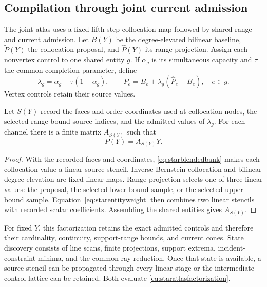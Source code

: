 \subsection{Compilation through joint current admission}
The joint atlas uses a fixed fifth-step collocation map followed by shared
range and current admission. Let $B(Y)$ be the degree-elevated bilinear
baseline, $\widetilde P(Y)$ the collocation proposal, and $\widehat P(Y)$ its
range projection. Assign each nonvertex control to one shared entity $g$.
If $\alpha_g$ is its simultaneous capacity and $\tau$ the common completion
parameter, define
\begin{equation}
 \lambda_g=\alpha_g+\tau(1-\alpha_g),\qquad
 P_e=B_e+\lambda_g(\widehat P_e-B_e),\quad e\in g.
 \label{eq:starentityweight}
\end{equation}
Vertex controls retain their source values.

\begin{theorem}
Let $S(Y)$ record the faces and order coordinates used at collocation nodes,
the selected range-bound source indices, and the admitted values of
$\lambda_g$. For each channel there is a finite matrix $A_{S(Y)}$ such that
\begin{equation}
 P(Y)=A_{S(Y)}Y.
 \label{eq:staratlasfactorization}
\end{equation}
\end{theorem}
\begin{proof}
With the recorded faces and coordinates, \eqref{eq:starblendedbank} makes each
collocation value a linear source stencil. Inverse Bernstein collocation and
bilinear degree elevation are fixed linear maps. Range projection selects
one of three linear values: the proposal, the selected lower-bound sample,
or the selected upper-bound sample. Equation~\eqref{eq:starentityweight}
then combines two linear stencils with recorded scalar coefficients.
Assembling the shared entities gives $A_{S(Y)}$.
\end{proof}

For fixed $Y$, this factorization retains the exact admitted controls and
therefore their cardinality, continuity, support-range bounds, and current
cones. State discovery consists of line scans, finite projections, support
extrema, incident-constraint minima, and the common ray reduction. Once that
state is available, a source stencil can be propagated through every linear
stage or the intermediate control lattice can be retained. Both evaluate
\eqref{eq:staratlasfactorization}.

